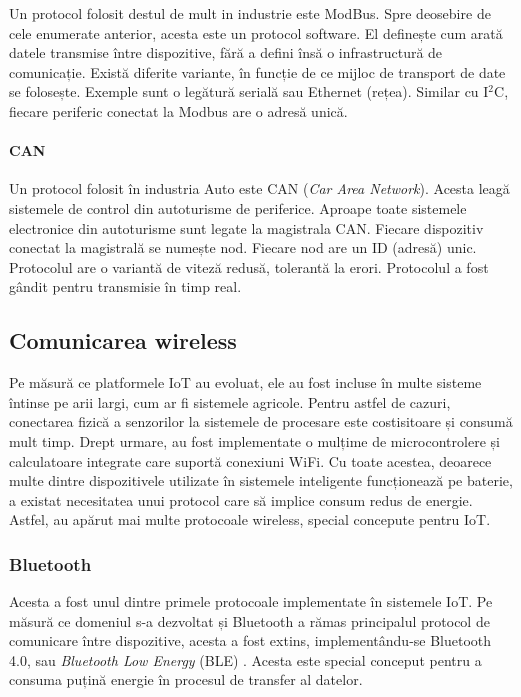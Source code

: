 Un protocol folosit destul de mult in industrie este ModBus.
Spre deosebire de cele enumerate anterior, acesta este un protocol software.
El definește cum arată datele transmise între dispozitive, fără a defini însă o infrastructură de comunicație.
Există diferite variante, în funcție de ce mijloc de transport de date se folosește.
Exemple sunt o legătură serială sau Ethernet (rețea).
 Similar cu I$^2$C, fiecare periferic conectat la Modbus are o adresă unică.

\paragraph{CAN}

Un protocol folosit în industria Auto este CAN (\textit{Car Area Network}).
Acesta leagă sistemele de control din autoturisme de periferice.
Aproape toate sistemele electronice din autoturisme sunt legate la magistrala CAN.
Fiecare dispozitiv conectat la magistrală se numește nod.
Fiecare nod are un ID (adresă) unic.
Protocolul are o variantă de viteză redusă, tolerantă la erori.
Protocolul a fost gândit pentru transmisie în timp real.

\subsection{Comunicarea wireless}
\label{sec:embed:bus:wireless}

Pe măsură ce platformele IoT au evoluat, ele au fost incluse în multe sisteme întinse pe arii largi, cum ar fi sistemele agricole.
Pentru astfel de cazuri, conectarea fizică a senzorilor la sistemele de procesare este costisitoare și consumă mult timp.
Drept urmare, au fost implementate o mulțime de microcontrolere și calculatoare integrate care suportă conexiuni WiFi.
Cu toate acestea, deoarece multe dintre dispozitivele utilizate în sistemele inteligente funcționează pe baterie, a existat necesitatea unui protocol care să implice consum redus de energie.
Astfel, au apărut mai multe protocoale wireless, special concepute pentru IoT.

\subsubsection{Bluetooth}
\label{sec:embed:bus:wireless:bluetooth}

Acesta a fost unul dintre primele protocoale implementate în sistemele IoT.
Pe măsură ce domeniul s-a dezvoltat și Bluetooth a rămas principalul protocol de comunicare între dispozitive, acesta a fost extins, implementându-se Bluetooth 4.0, sau \textit{Bluetooth Low Energy} (BLE) .
Acesta este special conceput pentru a consuma puțină energie în procesul de transfer al datelor.

